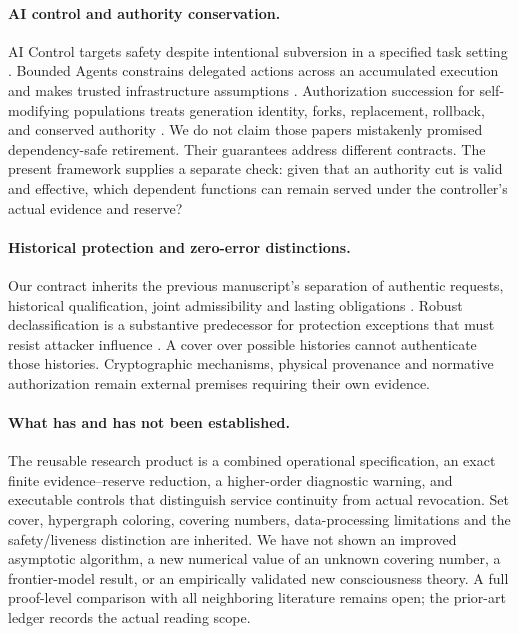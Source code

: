 \documentclass[11pt,a4paper]{article}
\theoremstyle{definition}\newtheorem{definition}{Definition}
\begin{document}
\paragraph{AI control and authority conservation.}
AI Control targets safety despite intentional subversion in a specified task setting \cite{greenblatt}. Bounded Agents constrains delegated actions across an accumulated execution and makes trusted infrastructure assumptions \cite{muruaga}. Authorization succession for self-modifying populations treats generation identity, forks, replacement, rollback, and conserved authority \cite{zhu}. We do not claim those papers mistakenly promised dependency-safe retirement. Their guarantees address different contracts. The present framework supplies a separate check: given that an authority cut is valid and effective, which dependent functions can remain served under the controller's actual evidence and reserve?

\paragraph{Historical protection and zero-error distinctions.}
Our contract inherits the previous manuscript's separation of authentic requests, historical qualification, joint admissibility and lasting obligations \cite{liu3}. Robust declassification is a substantive predecessor for protection exceptions that must resist attacker influence \cite{myers}. A cover over possible histories cannot authenticate those histories. Cryptographic mechanisms, physical provenance and normative authorization remain external premises requiring their own evidence.

\paragraph{What has and has not been established.}
The reusable research product is a combined operational specification, an exact finite evidence--reserve reduction, a higher-order diagnostic warning, and executable controls that distinguish service continuity from actual revocation. Set cover, hypergraph coloring, covering numbers, data-processing limitations and the safety/liveness distinction are inherited. We have not shown an improved asymptotic algorithm, a new numerical value of an unknown covering number, a frontier-model result, or an empirically validated new consciousness theory. A full proof-level comparison with all neighboring literature remains open; the prior-art ledger records the actual reading scope.
\end{document}
